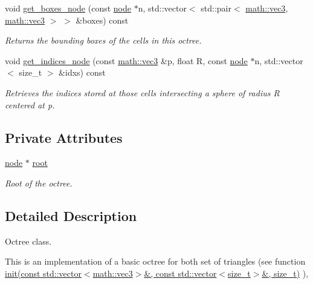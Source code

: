 \begin{DoxyCompactItemize}
void \hyperlink{classphysim_1_1structures_1_1octree_a4cd66ca4218ba9ff09ba953c4264f8ed}{get\+\_\+boxes\+\_\+node} (const \hyperlink{structphysim_1_1structures_1_1octree_1_1node}{node} $\ast$n, std\+::vector$<$ std\+::pair$<$ \hyperlink{structphysim_1_1math_1_1vec3}{math\+::vec3}, \hyperlink{structphysim_1_1math_1_1vec3}{math\+::vec3} $>$ $>$ \&boxes) const
\begin{DoxyCompactList}\small\item\em Returns the bounding boxes of the cells in this octree. \end{DoxyCompactList}\item 
void \hyperlink{classphysim_1_1structures_1_1octree_aec88b11968f8899022a93cb22b900398}{get\+\_\+indices\+\_\+node} (const \hyperlink{structphysim_1_1math_1_1vec3}{math\+::vec3} \&p, float R, const \hyperlink{structphysim_1_1structures_1_1octree_1_1node}{node} $\ast$n, std\+::vector$<$ size\+\_\+t $>$ \&idxs) const
\begin{DoxyCompactList}\small\item\em Retrieves the indices stored at those cells intersecting a sphere of radius {\itshape R} centered at {\itshape p}. \end{DoxyCompactList}\end{DoxyCompactItemize}
\subsection*{Private Attributes}
\begin{DoxyCompactItemize}
\item 
\mbox{\label{classphysim_1_1structures_1_1octree_a20e74f30f2e76fa03899e236fcedaac4}} 
\hyperlink{structphysim_1_1structures_1_1octree_1_1node}{node} $\ast$ \hyperlink{classphysim_1_1structures_1_1octree_a20e74f30f2e76fa03899e236fcedaac4}{root}
\begin{DoxyCompactList}\small\item\em Root of the octree. \end{DoxyCompactList}\end{DoxyCompactItemize}


\subsection{Detailed Description}
Octree class. 

This is an implementation of a basic octree for both set of triangles (see function \hyperlink{classphysim_1_1structures_1_1octree_add00dd5e93158b3fb54a7c8e37f01e8f}{init(const std\+::vector$<$math\+::vec3$>$\&, const std\+::vector$<$size\+\_\+t$>$\&, size\+\_\+t)} ),

